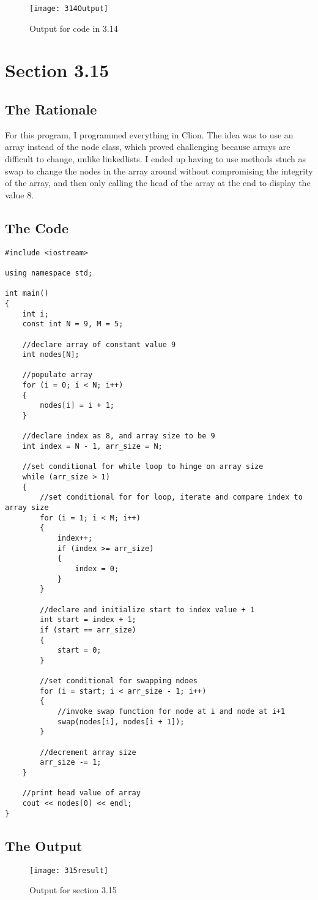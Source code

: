 \documentclass[11pt]{article}
\begin{document}
\begin{figure}[ht]
    \centering
    \texttt{[image: 314Output]}
    \caption{Output for code in 3.14}
    \label{fig:my_label}
\end{figure}

\newpage
\section*{Section 3.15}

\subsection*{The Rationale}
For this program, I programmed everything in Clion. The idea was to use an array instead of the node class, which proved challenging because arrays are difficult to change, unlike linkedlists. I ended up having to use methods stuch as swap to change the nodes in the array around without compromising the integrity of the array, and then only calling the head of the array at the end to display the value 8. 

\subsection*{The Code}
\begin{lstlisting}
#include <iostream>

using namespace std;

int main()
{
    int i;
    const int N = 9, M = 5;

    //declare array of constant value 9
    int nodes[N];

    //populate array
    for (i = 0; i < N; i++)
    {
        nodes[i] = i + 1;
    }

    //declare index as 8, and array size to be 9
    int index = N - 1, arr_size = N;

    //set conditional for while loop to hinge on array size
    while (arr_size > 1)
    {
        //set conditional for for loop, iterate and compare index to array size
        for (i = 1; i < M; i++)
        {
            index++;
            if (index >= arr_size)
            {
                index = 0;
            }
        }

        //declare and initialize start to index value + 1
        int start = index + 1;
        if (start == arr_size)
        {
            start = 0;
        }

        //set conditional for swapping ndoes
        for (i = start; i < arr_size - 1; i++)
        {
            //invoke swap function for node at i and node at i+1
            swap(nodes[i], nodes[i + 1]);
        }

        //decrement array size
        arr_size -= 1;
    }

    //print head value of array
    cout << nodes[0] << endl;
}
\end{lstlisting}

\subsection*{The Output}
\begin{figure}[h]
    \centering
    \texttt{[image: 315result]}
    \caption{Output for section 3.15}
    \label{fig:my_label}
\end{figure}
\end{document}
